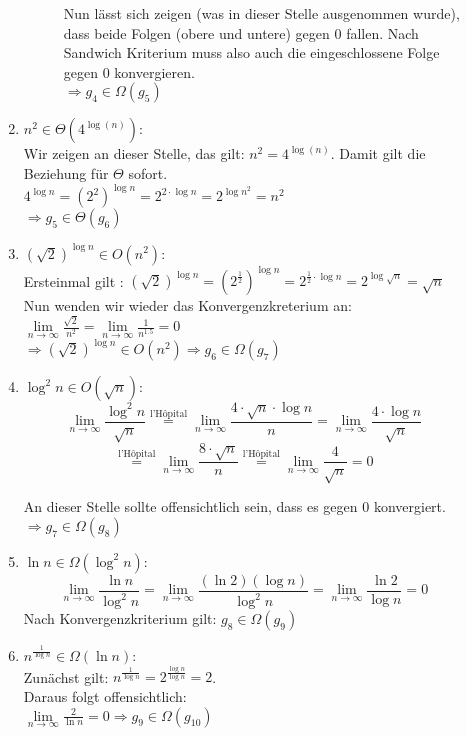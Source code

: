 \documentclass[11pt,a4paper,ngerman]{article}
\begin{document}
\begin{description}
\begin{enumerate}[\bfseries 1.]
\begin{description}
Nun lässt sich zeigen (was in dieser Stelle ausgenommen wurde), dass beide Folgen (obere und untere) gegen 0 fallen. Nach Sandwich Kriterium muss also auch die eingeschlossene Folge gegen 0 konvergieren.\\
$\Rightarrow g_4 \in \Omega (g_5)$

\end{description}

\item
$n^2 \in \Theta (4^{\log{(n)}})$: \\
Wir zeigen an dieser Stelle, das gilt: $n^2 = 4^{\log{(n)}}$. Damit gilt die Beziehung für $\Theta$ sofort.\\
$4^{\log n} = (2^2)^{\log n} =  2^{2\cdot \log n} = 2^{\log n^2} = n^2$\\
$\Rightarrow g_5 \in \Theta (g_6)$

\item
$(\sqrt{2})^{\log{n}} \in O (n^2)$:\\
Ersteinmal gilt : $(\sqrt{2})^{\log{n}} = (2^{\frac{1}{2}})^{\log n} = 2^{\frac{1}{2} \cdot \log n} = 2^{\log \sqrt{n}} = \sqrt{n}$\\
Nun wenden wir wieder das Konvergenzkreterium an: \\
$\underset{n\rightarrow\infty}{\lim} \frac{\sqrt{2}}{n^2} = \underset{n\rightarrow\infty}{\lim} \frac{1}{n^{1.5}} = 0$\\
$\Rightarrow (\sqrt{2})^{\log{n}} \in O (n^2) \Rightarrow g_6 \in \Omega (g_7)$

\item
$\log^2 n \in O (\sqrt{n})$: \\
$$\underset{n\rightarrow\infty}{\lim} \frac{\log^2 n}{\sqrt{n}} \stackrel{\text{l'Hôpital}}{=} \underset{n\rightarrow\infty}{\lim} \frac{4\cdot\sqrt{n} \cdot  \log n}{n} = \underset{n\rightarrow\infty}{\lim} \frac{4\cdot \log n}{\sqrt{n} } $$
$$
\stackrel{\text{l'Hôpital}}{=} \underset{n\rightarrow\infty}{\lim} \frac{8\cdot \sqrt{n}}{n} \stackrel{\text{l'Hôpital}}{=} \underset{n\rightarrow\infty}{\lim} \frac{4}{\sqrt{n}} = 0
$$

An dieser Stelle sollte offensichtlich sein, dass es gegen 0 konvergiert.\\ $\Rightarrow g_7 \in \Omega (g_8)$

\item
$\ln n \in \Omega (\log^2 n)$: \\
$$\underset{n\rightarrow\infty}{\lim} \frac{\ln n}{\log^2 n} = \underset{n\rightarrow\infty}{\lim} \frac{(\ln 2)(\log n)}{\log^2 n} = \underset{n\rightarrow\infty}{\lim} \frac{\ln 2}{\log n} = 0$$
Nach Konvergenzkriterium gilt: $g_8 \in \Omega(g_9)$
\item
$n^{\frac{1}{\log n}} \in \Omega (\ln n)$: \\
Zunächst gilt: $n^{\frac{1}{\log n}} = 2^{\frac{\log n}{\log n}} = 2$.\\
Daraus folgt offensichtlich:\\
$\underset{n\rightarrow\infty}{\lim} \frac{2}{\ln n} = 0 \Rightarrow g_9 \in \Omega (g_{10})$

\end{enumerate}
\end{description}
\end{document}
